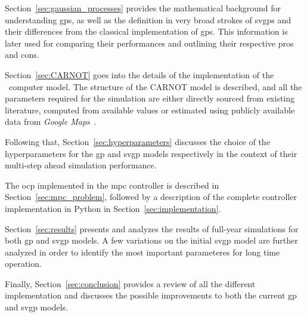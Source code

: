 Section~\ref{sec:gaussian_processes} provides the mathematical background for
understanding \acrshort{gp}s, as well as the definition in very broad strokes of
\acrshort{svgp}s and their differences from the classical implementation of
\acrshort{gp}s. This information is later used for comparing their performances
and outlining their respective pros and cons.

Section~\ref{sec:CARNOT} goes into the details of the implementation of the
\pdome\ computer model. The structure of the CARNOT model is described, and all
the parameters required for the simulation are either directly sourced from
existing literature, computed from available values or estimated using publicly
available data from \textit{Google Maps}~\cite{GoogleMaps}.

Following that, Section~\ref{sec:hyperparameters} discusses the choice of the
hyperparameters for the \acrshort{gp} and \acrshort{svgp} models respectively in
the context of their multi-step ahead simulation performance.

The \acrlong{ocp} implemented in the \acrshort{mpc} controller is described in
Section~\ref{sec:mpc_problem}, followed by a description of the complete
controller implementation in Python in Section~\ref{sec:implementation}.

Section~\ref{sec:results} presents and analyzes the results of full-year
simulations for both \acrshort{gp} and \acrshort{svgp} models. A few variations
on the initial \acrshort{svgp} model are further analyzed in order to identify
the most important parameteres for long time operation.

Finally, Section~\ref{sec:conclusion} provides a review of all the different
implementation and  discusses the possible improvements to both the current
\acrshort{gp} and \acrshort{svgp} models.

\clearpage
